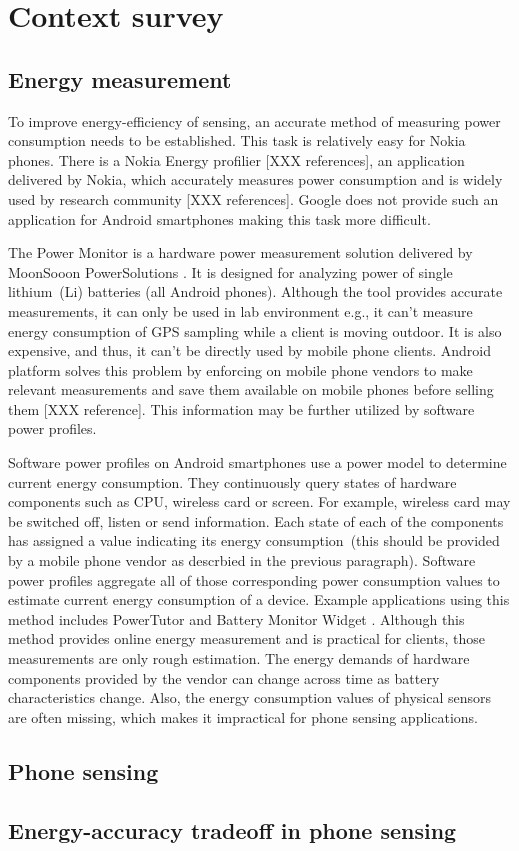\section{Context survey}
\label{s:contextsurvey}
\subsection{Energy measurement}
\hspace{10pt} To improve energy-efficiency of sensing, an accurate method of measuring power consumption needs to be established. This task is relatively easy for Nokia phones. There is a Nokia Energy profilier [XXX references], an application delivered by Nokia, which accurately measures power consumption and is widely used by research community [XXX references]. Google does not provide such an application for Android smartphones making this task more difficult.

The Power Monitor is a hardware power measurement solution delivered by MoonSooon PowerSolutions \cite{_monsoon_????}.  It is designed for analyzing power of single lithium\ (Li) batteries (all Android phones). Although the tool provides accurate measurements, it can only be used in lab environment e.g., it can't measure energy consumption of GPS sampling while a client is moving outdoor. It is also expensive, and thus, it can't be directly used by mobile phone clients. Android platform solves this problem by enforcing on mobile phone vendors to make relevant measurements and save them available on mobile phones before selling them [XXX reference]. This information may be further utilized by software power profiles.

Software power profiles on Android smartphones use a power model to determine current energy consumption. They continuously query states of hardware components such as CPU, wireless card or screen. For example, wireless card may be switched off, listen or send information. Each state of each of the components has assigned a value indicating its energy consumption\ (this should be provided by a mobile phone vendor as descrbied in the previous paragraph). Software power profiles aggregate all of those corresponding power consumption values to estimate current energy consumption of a device. Example applications using this method includes PowerTutor \cite{zhang:powertutor} and Battery Monitor Widget \cite{_battery_????}. Although this method provides online energy measurement and is practical for clients, those measurements are only rough estimation. The energy demands of hardware components provided by the vendor can change across time as battery characteristics change. Also, the energy consumption values of physical sensors are often missing, which makes it impractical for phone sensing applications.





\subsection{Phone sensing}
\subsection{Energy-accuracy tradeoff in phone sensing}